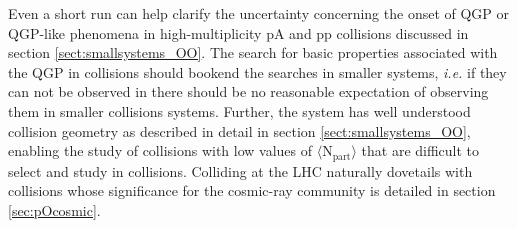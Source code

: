 Even a short \OO run can help clarify the uncertainty concerning the onset of QGP or QGP-like phenomena in high-multiplicity pA and pp collisions discussed in section \ref{sect:smallsystems_OO}.  The search for basic properties associated with the QGP in \OO collisions should bookend the searches in smaller systems, \textit{i.e.} if they can not be observed in \OO there should be no reasonable expectation of observing them in smaller collisions systems.  Further, the \OO system has well understood collision geometry as described in detail in section \ref{sect:smallsystems_OO}, enabling the study of collisions with low values of $\langle \mathrm{N_{part}}\rangle$ that are difficult to select and study in \PbPb collisions.  Colliding \OO at the LHC naturally dovetails with \pO collisions whose significance for the cosmic-ray community is detailed in section \ref{sec:pOcosmic}.

